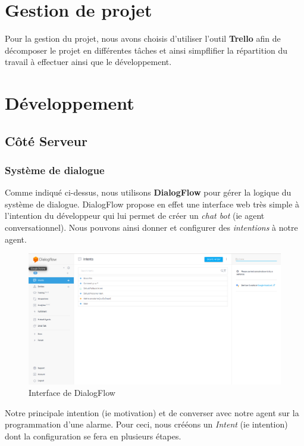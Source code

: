 \section{Gestion de projet}

Pour la gestion du projet, nous avons choisis d'utiliser l'outil \textbf{Trello}\cite{trello} afin de décomposer le projet en différentes tâches et ainsi simpflifier 
la répartition du travail à effectuer ainsi que le développement. 

\section{Développement}

\subsection{Côté Serveur}

\subsubsection{Système de dialogue}

Comme indiqué ci-dessus, nous utilisons \textbf{DialogFlow} pour gérer la logique du système de dialogue. DialogFlow propose en effet une interface web très simple à 
l'intention du développeur qui lui permet de créer un \emph{chat bot} (ie agent conversationnel). Nous pouvons ainsi donner et configurer des \emph{intentions} à notre agent.\\

\begin{figure}[H]
    \centering
        \centering
        \includegraphics[width=1\textwidth]{images/dialogflow.png}
        \caption{Interface de DialogFlow}
\end{figure}

Notre principale intention (ie motivation) et de converser avec notre agent sur la programmation d'une alarme. Pour ceci, nous crééons un \emph{Intent} (ie intention) dont 
la configuration se fera en plusieurs étapes.\\

